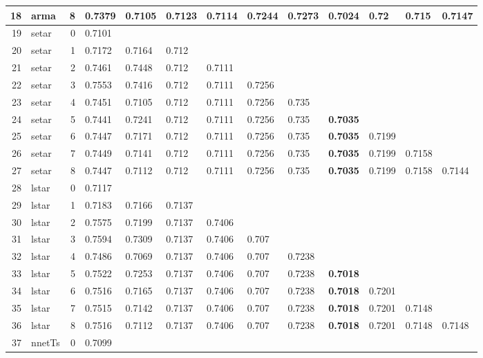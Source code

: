 \documentclass[10pt,a4paper]{article}
\begin{document}
\begin{table}[ht]
\begin{tabular}{rlrllllllllll}
  18 & arma &     8 & 0.7379 & 0.7105 & 0.7123 & 0.7114 & 0.7244 & 0.7273 & \textbf{0.7024} & 0.72 & 0.715 & 0.7147 \\ 
   \hline
19 & setar &     0 & 0.7101 &  &  &  &  &  &  &  &  &  \\ 
  20 & setar &     1 & 0.7172 & 0.7164 & 0.712 &  &  &  &  &  &  &  \\ 
  21 & setar &     2 & 0.7461 & 0.7448 & 0.712 & 0.7111 &  &  &  &  &  &  \\ 
  22 & setar &     3 & 0.7553 & 0.7416 & 0.712 & 0.7111 & 0.7256 &  &  &  &  &  \\ 
  23 & setar &     4 & 0.7451 & 0.7105 & 0.712 & 0.7111 & 0.7256 & 0.735 &  &  &  &  \\ 
  24 & setar &     5 & 0.7441 & 0.7241 & 0.712 & 0.7111 & 0.7256 & 0.735 & \textbf{0.7035} &  &  &  \\ 
  25 & setar &     6 & 0.7447 & 0.7171 & 0.712 & 0.7111 & 0.7256 & 0.735 & \textbf{0.7035} & 0.7199 &  &  \\ 
  26 & setar &     7 & 0.7449 & 0.7141 & 0.712 & 0.7111 & 0.7256 & 0.735 & \textbf{0.7035} & 0.7199 & 0.7158 &  \\ 
  27 & setar &     8 & 0.7447 & 0.7112 & 0.712 & 0.7111 & 0.7256 & 0.735 & \textbf{0.7035} & 0.7199 & 0.7158 & 0.7144 \\ 
   \hline
28 & lstar &     0 & 0.7117 &  &  &  &  &  &  &  &  &  \\ 
  29 & lstar &     1 & 0.7183 & 0.7166 & 0.7137 &  &  &  &  &  &  &  \\ 
  30 & lstar &     2 & 0.7575 & 0.7199 & 0.7137 & 0.7406 &  &  &  &  &  &  \\ 
  31 & lstar &     3 & 0.7594 & 0.7309 & 0.7137 & 0.7406 & 0.707 &  &  &  &  &  \\ 
  32 & lstar &     4 & 0.7486 & 0.7069 & 0.7137 & 0.7406 & 0.707 & 0.7238 &  &  &  &  \\ 
  33 & lstar &     5 & 0.7522 & 0.7253 & 0.7137 & 0.7406 & 0.707 & 0.7238 & \textbf{0.7018} &  &  &  \\ 
  34 & lstar &     6 & 0.7516 & 0.7165 & 0.7137 & 0.7406 & 0.707 & 0.7238 & \textbf{0.7018} & 0.7201 &  &  \\ 
  35 & lstar &     7 & 0.7515 & 0.7142 & 0.7137 & 0.7406 & 0.707 & 0.7238 & \textbf{0.7018} & 0.7201 & 0.7148 &  \\ 
  36 & lstar &     8 & 0.7516 & 0.7112 & 0.7137 & 0.7406 & 0.707 & 0.7238 & \textbf{0.7018} & 0.7201 & 0.7148 & 0.7148 \\ 
   \hline
37 & nnetTs &     0 & 0.7099 &  &  &  &  &  &  &  &  &  \\ 

\end{tabular}
\end{table}
\end{document}
